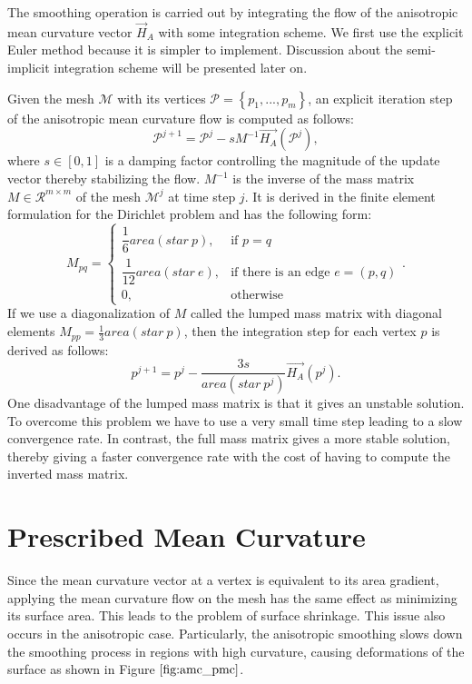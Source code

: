 \documentclass[11pt]{article}
\begin{document}
The smoothing operation is carried out by integrating the flow of the anisotropic mean curvature vector $\vec{H}_A$ with some integration scheme. We first use the explicit Euler method because it is simpler to implement. Discussion about the semi-implicit integration scheme will be presented later on.

Given the mesh $\mathcal{M}$ with its vertices $\mathcal{P} = \left\lbrace p_1, ..., p_m \right\rbrace $, an explicit iteration step of the anisotropic mean curvature flow is computed as follows:
\begin{equation}
\mathcal{P}^{j+1} = \mathcal{P}^j -sM^{-1}\vec{H_A}(\mathcal{P}^j),
\label{eq:explicit}
\end{equation}
where $s \in [0, 1]$ is a damping factor controlling the magnitude of the update vector thereby stabilizing the flow. $M^{-1}$ is the inverse of the mass matrix $M \in \mathcal{R}^{m \times m}$ of the mesh $\mathcal{M}^j$ at time step $j$. It is derived in the finite element formulation for the Dirichlet problem \cite{Wardetzky08Cotan} and has the following form:
\begin{equation}
M_{pq} = 
\begin{cases} \dfrac{1}{6}area(star\ p), & \mbox{if } p=q \\ 
\dfrac{1}{12}area(star\ e), & \mbox{if there is an edge } e=(p, q) \\
0, & \mbox{otherwise} \end{cases}.
\label{eq:mass_matrix}
\end{equation}
If we use a diagonalization of $M$ called the lumped mass matrix with diagonal elements $M_{pp} = \frac{1}{3} area(star\ p)$, then the integration step for each vertex $p$ is derived as follows:
\begin{equation}
p^{j+1} = p^{j} - \dfrac{3s}{area(star\ p^j)}\vec{H_A}(p^j).
\end{equation}
One disadvantage of the lumped mass matrix is that it gives an unstable solution. To overcome this problem we have to use a very small time step leading to a slow convergence rate. In contrast, the full mass matrix gives a more stable solution, thereby giving a faster convergence rate with the cost of having to compute the inverted mass matrix.

\section{Prescribed Mean Curvature}

Since the mean curvature vector at a vertex is equivalent to its area gradient, applying the mean curvature flow on the mesh has the same effect as minimizing its surface area. This leads to the problem of surface shrinkage. This issue also occurs in the anisotropic case. Particularly, the anisotropic smoothing slows down the smoothing process in regions with high curvature, causing
deformations of the surface as shown in Figure $\ref{fig:amc_pmc}$.
\end{document}
